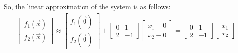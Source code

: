 \begin{enumerate}
{        So, the linear approximation of the system is as follows:
        \begin{align*}
        \begin{bmatrix}
            f_1(\vec{x}) \\
            f_2(\vec{x})
        \end{bmatrix} \approx
        \begin{bmatrix}
            f_1(\vec{0}) \\
            f_2(\vec{0})
        \end{bmatrix} +
        \begin{bmatrix}
            0 & 1 \\
            2 & -1
        \end{bmatrix} 
        \begin{bmatrix}
            x_1 - 0 \\
            x_2 - 0
        \end{bmatrix} =
        \begin{bmatrix}
            0 & 1 \\
            2 & -1
        \end{bmatrix} 
        \begin{bmatrix}
            x_1 \\
            x_2
        \end{bmatrix}
    \end{align*}
    }
\end{enumerate}